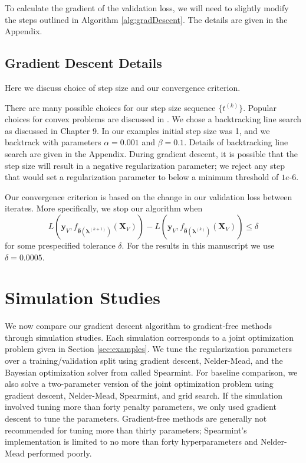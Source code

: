 \documentclass[12pt]{article}
\begin{document}
To calculate the gradient of the validation loss, we will need to slightly modify the steps outlined in Algorithm \ref{alg:gradDescent}. The details are given in the Appendix.


\subsection{Gradient Descent Details}\label{sec:alg_details}
Here we discuss choice of step size and our convergence criterion.

There are many possible choices for our step size sequence $\{t^{(k)}\}$. Popular choices for convex problems are discussed in \citet{boyd2004convex}. We chose a backtracking line search as discussed in Chapter 9. In our examples initial step size was 1, and we backtrack with parameters $\alpha = 0.001$ and $\beta = 0.1$. Details of backtracking line search are given in the Appendix. During gradient descent, it is possible that the step size will result in a negative regularization parameter; we reject any step that would set a regularization parameter to below a minimum threshold of $1e$-6.

Our convergence criterion is based on the change in our validation loss between iterates. More specifically, we stop our algorithm when
\[
L \left( \boldsymbol{y}_V, f_{\hat{\boldsymbol \theta}(\boldsymbol{\lambda}^{(k+1)})}(\boldsymbol{X}_V)\right) -
L \left( \boldsymbol{y}_V, f_{\hat{\boldsymbol \theta}(\boldsymbol{\lambda}^{(k)})}(\boldsymbol{X}_V)\right) \leq \delta
\]
for some prespecified tolerance $\delta$. For the results in this manuscript we use $\delta = 0.0005$.

\section{Simulation Studies}\label{sec:results}

We now compare our gradient descent algorithm to gradient-free methods through simulation studies. Each simulation corresponds to a joint optimization problem given in Section \ref{sec:examples}. We tune the regularization parameters over a training/validation split using gradient descent, Nelder-Mead, and the Bayesian optimization solver from \citet{snoek2012practical} called Spearmint. For baseline comparison, we also solve a two-parameter version of the joint optimization problem using gradient descent, Nelder-Mead, Spearmint, and grid search. If the simulation involved tuning more than forty penalty parameters, we only used gradient descent to tune the parameters. Gradient-free methods are generally not recommended for tuning more than thirty parameters; Spearmint's implementation is limited to no more than forty hyperparameters and Nelder-Mead performed poorly.
\end{document}
